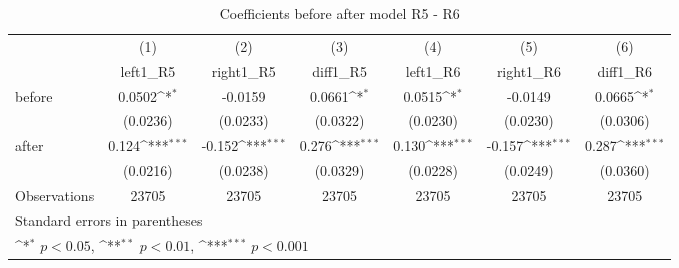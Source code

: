 \begin{table}[!ht]\centering \footnotesize
\def\sym#1{\ifmmode^{#1}\else\(^{#1}\)\fi}
\caption{Coefficients before after model R5 - R6}
\begin{tabular}{l*{6}{c}}
\hline\hline
                    &\multicolumn{1}{c}{(1)}&\multicolumn{1}{c}{(2)}&\multicolumn{1}{c}{(3)}&\multicolumn{1}{c}{(4)}&\multicolumn{1}{c}{(5)}&\multicolumn{1}{c}{(6)}\\
                    &\multicolumn{1}{c}{left1\_R5}&\multicolumn{1}{c}{right1\_R5}&\multicolumn{1}{c}{diff1\_R5}&\multicolumn{1}{c}{left1\_R6}&\multicolumn{1}{c}{right1\_R6}&\multicolumn{1}{c}{diff1\_R6}\\
\hline
before              &      0.0502\sym{*}  &     -0.0159         &      0.0661\sym{*}  &      0.0515\sym{*}  &     -0.0149         &      0.0665\sym{*}  \\
                    &    (0.0236)         &    (0.0233)         &    (0.0322)         &    (0.0230)         &    (0.0230)         &    (0.0306)         \\
[1em]
after               &       0.124\sym{***}&      -0.152\sym{***}&       0.276\sym{***}&       0.130\sym{***}&      -0.157\sym{***}&       0.287\sym{***}\\
                    &    (0.0216)         &    (0.0238)         &    (0.0329)         &    (0.0228)         &    (0.0249)         &    (0.0360)         \\
\hline
Observations        &       23705         &       23705         &       23705         &       23705         &       23705         &       23705         \\
\hline\hline
\multicolumn{7}{l}{\footnotesize Standard errors in parentheses}\\
\multicolumn{7}{l}{\footnotesize \sym{*} \(p<0.05\), \sym{**} \(p<0.01\), \sym{***} \(p<0.001\)}\\
\end{tabular}
\end{table}
